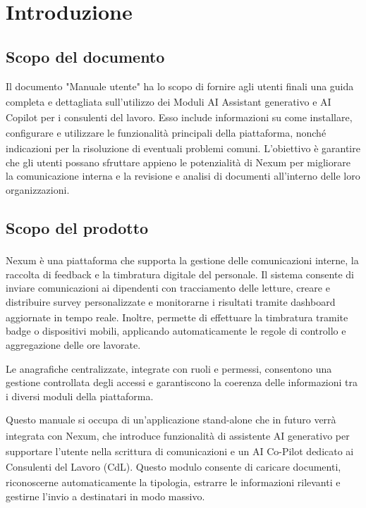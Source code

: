 \documentclass[a4paper,11pt]{article}
\newcommand{\G}{\textsubscript{\scalebox{0.6}{\textbf{G}}}}
\begin{document}
\newpage
\tableofcontents

\newpage

\section{Introduzione}

\subsection{Scopo del documento}
Il documento "Manuale utente\G{}" ha lo scopo di fornire agli utenti finali una guida completa e dettagliata sull'utilizzo dei Moduli AI Assistant\G{} generativo e AI Copilot\G{} per i consulenti del lavoro\G{}. 
Esso include informazioni su come installare, configurare e utilizzare le funzionalità\G{} principali della piattaforma, nonché indicazioni per la risoluzione di eventuali problemi comuni. 
L'obiettivo è garantire che gli utenti possano sfruttare appieno le potenzialità di Nexum per migliorare la comunicazione interna e la revisione e analisi di documenti all'interno delle loro organizzazioni.


\subsection{Scopo del prodotto\G{}}
Nexum è una piattaforma che supporta la gestione delle comunicazioni interne, la raccolta di feedback e la timbratura digitale del personale.
Il sistema consente di inviare comunicazioni ai dipendenti con tracciamento delle letture, creare e distribuire survey personalizzate e monitorarne i risultati tramite dashboard\G{} aggiornate in tempo reale. 
Inoltre, permette di effettuare la timbratura tramite badge o dispositivi mobili, applicando automaticamente le regole di controllo e aggregazione delle ore lavorate.

Le anagrafiche centralizzate, integrate con ruoli e permessi, consentono una gestione controllata degli accessi e garantiscono la coerenza delle informazioni tra i diversi moduli della piattaforma.

Questo manuale si occupa di un'applicazione stand-alone\G{} che in futuro verrà integrata con Nexum, che introduce funzionalità\G{} di assistente AI\G{} generativo per supportare l'utente nella scrittura di comunicazioni e un AI Co-Pilot\G{} dedicato ai Consulenti del Lavoro (CdL)\G{}.
Questo modulo\G{} consente di caricare documenti, riconoscerne automaticamente la tipologia, estrarre le informazioni rilevanti e gestirne l'invio a destinatari in modo massivo.
\end{document}
